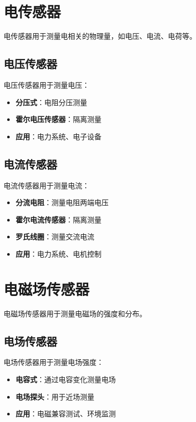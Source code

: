 \documentclass[12pt,UTF8]{ctexbook}
\begin{document}
\section{电传感器}

电传感器用于测量电相关的物理量，如电压、电流、电荷等。

\subsection{电压传感器}

电压传感器用于测量电压：

\begin{itemize}[leftmargin=2cm]
	\item \textbf{分压式}：电阻分压测量
	\item \textbf{霍尔电压传感器}：隔离测量
	\item \textbf{应用}：电力系统、电子设备
\end{itemize}

\subsection{电流传感器}

电流传感器用于测量电流：

\begin{itemize}[leftmargin=2cm]
	\item \textbf{分流电阻}：测量电阻两端电压
	\item \textbf{霍尔电流传感器}：隔离测量
	\item \textbf{罗氏线圈}：测量交流电流
	\item \textbf{应用}：电力系统、电机控制
\end{itemize}

\section{电磁场传感器}

电磁场传感器用于测量电磁场的强度和分布。

\subsection{电场传感器}

电场传感器用于测量电场强度：

\begin{itemize}[leftmargin=2cm]
	\item \textbf{电容式}：通过电容变化测量电场
	\item \textbf{电场探头}：用于近场测量
	\item \textbf{应用}：电磁兼容测试、环境监测
\end{itemize}
\end{document}
